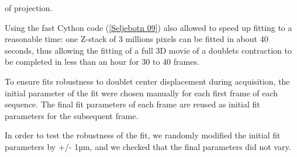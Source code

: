 \documentclass[A4paperpaper,11pt,english]{sphinxmanual}
\begin{document}
of projection.

Using the fast Cython code ({\hyperref[parts/part4:seljebotn2009]{{[}Seljebotn 09{]}}}) also allowed to speed
up fitting to a reasonable time: one Z-stack of 3 millions pixels can be fitted
in about 40 seconds, thus allowing the fitting of a full 3D movie of a doublets
contraction to be completed in less than an hour for 30 to 40 frames.

To ensure fits robustness to doublet center displacement during
acquisition, the initial parameter of the fit were chosen manually for each
first frame of each sequence. The final fit parameters of each frame are reused
as initial fit parameters for the subsequent frame.

In order to test the robustness of the fit, we randomly modified the initial fit parameters by +/- 1µm, and we checked that the final parameters did
not vary.
\end{document}
